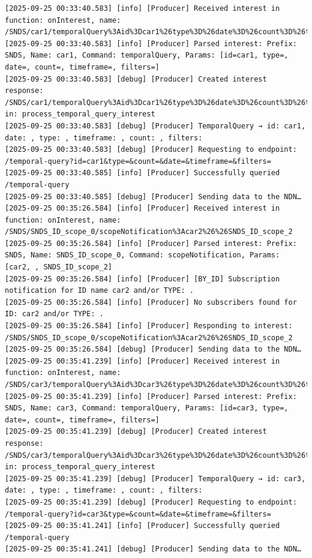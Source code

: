 \documentclass{article}
\begin{document}
\begin{lstlisting}[language=log, caption={Producer Log File},label={lst:producer-log-file}]
[2025-09-25 00:33:40.583] [info] [Producer] Received interest in function: onInterest, name: /SNDS/car1/temporalQuery%3Aid%3Dcar1%26type%3D%26date%3D%26count%3D%26timeframe%3D%26filters%3D
[2025-09-25 00:33:40.583] [info] [Producer] Parsed interest: Prefix: SNDS, Name: car1, Command: temporalQuery, Params: [id=car1, type=, date=, count=, timeframe=, filters=]
[2025-09-25 00:33:40.583] [debug] [Producer] Created interest response: /SNDS/car1/temporalQuery%3Aid%3Dcar1%26type%3D%26date%3D%26count%3D%26timeframe%3D%26filters%3D in: process_temporal_query_interest
[2025-09-25 00:33:40.583] [debug] [Producer] TemporalQuery → id: car1, date: , type: , timeframe: , count: , filters: 
[2025-09-25 00:33:40.583] [debug] [Producer] Requesting to endpoint: /temporal-query?id=car1&type=&count=&date=&timeframe=&filters=
[2025-09-25 00:33:40.585] [info] [Producer] Successfully queried /temporal-query
[2025-09-25 00:33:40.585] [debug] [Producer] Sending data to the NDN…
[2025-09-25 00:35:26.584] [info] [Producer] Received interest in function: onInterest, name: /SNDS/SNDS_ID_scope_0/scopeNotification%3Acar2%26%26SNDS_ID_scope_2
[2025-09-25 00:35:26.584] [info] [Producer] Parsed interest: Prefix: SNDS, Name: SNDS_ID_scope_0, Command: scopeNotification, Params: [car2, , SNDS_ID_scope_2]
[2025-09-25 00:35:26.584] [info] [Producer] [BY_ID] Subscription notification for ID name car2 and/or TYPE: .
[2025-09-25 00:35:26.584] [info] [Producer] No subscribers found for ID: car2 and/or TYPE: .
[2025-09-25 00:35:26.584] [info] [Producer] Responding to interest: /SNDS/SNDS_ID_scope_0/scopeNotification%3Acar2%26%26SNDS_ID_scope_2
[2025-09-25 00:35:26.584] [debug] [Producer] Sending data to the NDN…
[2025-09-25 00:35:41.239] [info] [Producer] Received interest in function: onInterest, name: /SNDS/car3/temporalQuery%3Aid%3Dcar3%26type%3D%26date%3D%26count%3D%26timeframe%3D%26filters%3D
[2025-09-25 00:35:41.239] [info] [Producer] Parsed interest: Prefix: SNDS, Name: car3, Command: temporalQuery, Params: [id=car3, type=, date=, count=, timeframe=, filters=]
[2025-09-25 00:35:41.239] [debug] [Producer] Created interest response: /SNDS/car3/temporalQuery%3Aid%3Dcar3%26type%3D%26date%3D%26count%3D%26timeframe%3D%26filters%3D in: process_temporal_query_interest
[2025-09-25 00:35:41.239] [debug] [Producer] TemporalQuery → id: car3, date: , type: , timeframe: , count: , filters: 
[2025-09-25 00:35:41.239] [debug] [Producer] Requesting to endpoint: /temporal-query?id=car3&type=&count=&date=&timeframe=&filters=
[2025-09-25 00:35:41.241] [info] [Producer] Successfully queried /temporal-query
[2025-09-25 00:35:41.241] [debug] [Producer] Sending data to the NDN… 
\end{lstlisting}
\end{document}
